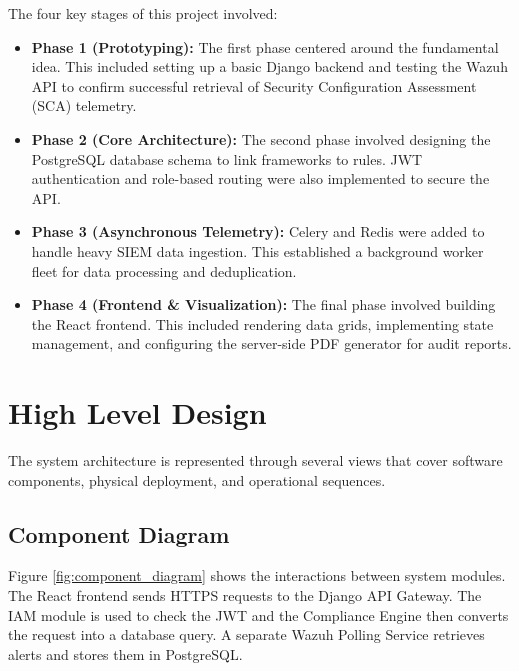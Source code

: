 The four key stages of this project involved:

\begin{itemize}
    \item \textbf{Phase 1 (Prototyping):} The first phase centered around the fundamental idea. This included setting up a basic Django backend and testing the Wazuh API to confirm successful retrieval of Security Configuration Assessment (SCA) telemetry.
    
    \item \textbf{Phase 2 (Core Architecture):} The second phase involved designing the PostgreSQL database schema to link frameworks to rules. JWT authentication and role-based routing were also implemented to secure the API.
    
    \item \textbf{Phase 3 (Asynchronous Telemetry):} Celery and Redis were added to handle heavy SIEM data ingestion. This established a background worker fleet for data processing and deduplication.
    
    \item \textbf{Phase 4 (Frontend \& Visualization):} The final phase involved building the React frontend. This included rendering data grids, implementing state management, and configuring the server-side PDF generator for audit reports.
\end{itemize}

\section{High Level Design}
The system architecture is represented through several views that cover software components, physical deployment, and operational sequences.

\subsection{Component Diagram}
Figure \ref{fig:component_diagram} shows the interactions between system modules. The React frontend sends HTTPS requests to the Django API Gateway. The IAM module is used to check the JWT and the Compliance Engine then converts the request into a database query. A separate Wazuh Polling Service retrieves alerts and stores them in PostgreSQL.

